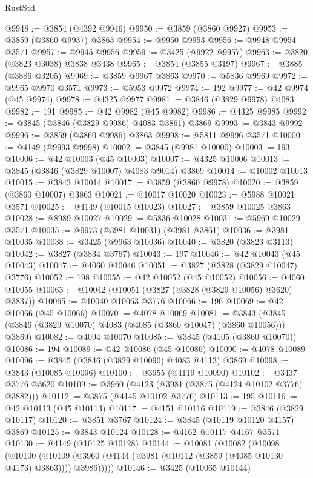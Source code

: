 \begin{lexlean}{RustStd}
\begin{coremodule}
@9948 := @3854 (@4392 @9946)
@9950 := @3859 (@3860 @9927)
@9953 := @3859 (@3860 @9937) @3863
@9954 := @9950 @9953
@9956 := @9948 @9954 @3571
@9957 := @9945 @9956
@9959 := @3425 (@9922 @9957)
@9963 := @3820 (@3823 @3038) @3838 @3438
@9965 := @3854 (@3855 @3197)
@9967 := @3885 (@3886 @3205)
@9969 := @3859 @9967 @3863
@9970 := @5836 @9969
@9972 := @9965 @9970 @3571
@9973 := @5953 @9972
@9974 := 192
@9977 := @42 @9974 (@45 @9974)
@9978 := @4325 @9977
@9981 := @3846 (@3829 @9978) @4083
@9982 := 191
@9985 := @42 @9982 (@45 @9982)
@9986 := @4325 @9985
@9992 := @3845 (@3846 (@3829 @9986) @4083 @3861) @3869
@9993 := @3843 @9992
@9996 := @3859 (@3860 @9986) @3863
@9998 := @5811 @9996 @3571
@10000 := @4149 (@9993 @9998)
@10002 := @3845 (@9981 @10000)
@10003 := 193
@10006 := @42 @10003 (@45 @10003)
@10007 := @4325 @10006
@10013 := @3845 (@3846 (@3829 @10007) @4083 @9014) @3869
@10014 := @10002 @10013
@10015 := @3843 @10014
@10017 := @3859 (@3860 @9978)
@10020 := @3859 (@3860 @10007) @3863
@10021 := @10017 @10020
@10023 := @5988 @10021 @3571
@10025 := @4149 (@10015 @10023)
@10027 := @3859 @10025 @3863
@10028 := @8989 @10027
@10029 := @5836 @10028
@10031 := @5969 @10029 @3571
@10035 := @9973 (@3981 @10031) (@3981 @3861)
@10036 := @3981 @10035
@10038 := @3425 (@9963 @10036)
@10040 := @3820 (@3823 @3113)
@10042 := @3827 (@3834 @3767)
@10043 := 197
@10046 := @42 @10043 (@45 @10043)
@10047 := @4060 @10046
@10051 := @3827 (@3828 (@3829 @10047) @3776)
@10052 := 198
@10055 := @42 @10052 (@45 @10052)
@10056 := @4060 @10055
@10063 := @10042 (@10051 (@3827 (@3828 (@3829 @10056) @3620) @3837))
@10065 := @10040 @10063 @3776
@10066 := 196
@10069 := @42 @10066 (@45 @10066)
@10070 := @4078 @10069
@10081 := @3843 (@3845 (@3846 (@3829 @10070) @4083 (@4085 (@3860 @10047) (@3860 @10056))) @3869)
@10082 := @4094 @10070
@10085 := @3845 (@4105 (@3860 @10070))
@10086 := 194
@10089 := @42 @10086 (@45 @10086)
@10090 := @4078 @10089
@10096 := @3845 (@3846 (@3829 @10090) @4083 @4113) @3869
@10098 := @3843 (@10085 @10096)
@10100 := @3955 (@4119 @10090)
@10102 := @3437 @3776 @3620
@10109 := @3960 (@4123 (@3981 (@3875 (@4124 @10102 @3776) @3882)))
@10112 := @3875 (@4145 @10102 @3776)
@10113 := 195
@10116 := @42 @10113 (@45 @10113)
@10117 := @4151 @10116
@10119 := @3846 (@3829 @10117)
@10120 := @3851 @3767
@10124 := @3845 (@10119 @10120 @4157) @3869
@10125 := @3843 @10124
@10128 := @4162 @10117 @4167 @3571
@10130 := @4149 (@10125 @10128)
@10144 := @10081
    (@10082
      (@10098
        (@10100
          (@10109 (@3960 (@4144 (@3981 (@10112 (@3859 (@4085 @10130 @4173) @3863)))) @3986)))))
@10146 := @3425 (@10065 @10144)

\end{coremodule}
\end{lexlean}
